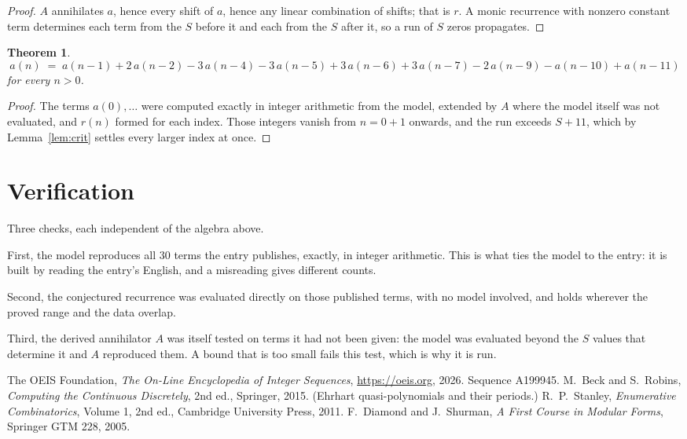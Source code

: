\documentclass[11pt,a4paper]{article}
\theoremstyle{plain}
\newtheorem{theorem}{Theorem}
\theoremstyle{definition}
\begin{document}
\begin{proof}
$A$ annihilates $a$, hence every shift of $a$, hence any linear combination of shifts; that is
$r$. A monic recurrence with nonzero constant term determines each term from the $S$ before it
and each from the $S$ after it, so a run of $S$ zeros propagates.
\end{proof}

\begin{theorem}
\[
a(n)\;=\;a(n-1) + 2\,a(n-2) - 3\,a(n-4) - 3\,a(n-5) + 3\,a(n-6) + 3\,a(n-7) - 2\,a(n-9) - a(n-10) + a(n-11)
\]
for every $n>0$.
\end{theorem}

\begin{proof}
The terms $a(0),\dots$ were computed exactly in integer arithmetic from the model, extended by
$A$ where the model itself was not evaluated, and $r(n)$ formed for each index. Those integers
vanish from $n=0+1$ onwards, and the run exceeds $S+11$, which by
Lemma~\ref{lem:crit} settles every larger index at once.
\end{proof}

\section{Verification}

Three checks, each independent of the algebra above.

First, the model reproduces all $30$ terms the entry publishes, exactly, in integer
arithmetic. This is what ties the model to the entry: it is built by reading the entry's
English, and a misreading gives different counts.

Second, the conjectured recurrence was evaluated directly on those published terms, with no
model involved, and holds wherever the proved range and the data overlap.

Third, the derived annihilator $A$ was itself tested on terms it had not been given: the model
was evaluated beyond the $S$ values that determine it and $A$ reproduced them. A bound that is
too small fails this test, which is why it is run.

\begin{thebibliography}{9}
 The OEIS Foundation, \emph{The On-Line Encyclopedia of Integer
Sequences}, \url{https://oeis.org}, 2026. Sequence A199945.
 M.~Beck and S.~Robins, \emph{Computing the Continuous Discretely},
2nd ed., Springer, 2015. (Ehrhart quasi-polynomials and their periods.)
 R.~P.~Stanley, \emph{Enumerative Combinatorics}, Volume 1, 2nd ed.,
Cambridge University Press, 2011.
 F.~Diamond and J.~Shurman, \emph{A First Course in Modular Forms},
Springer GTM 228, 2005.
\end{thebibliography}
\end{document}
